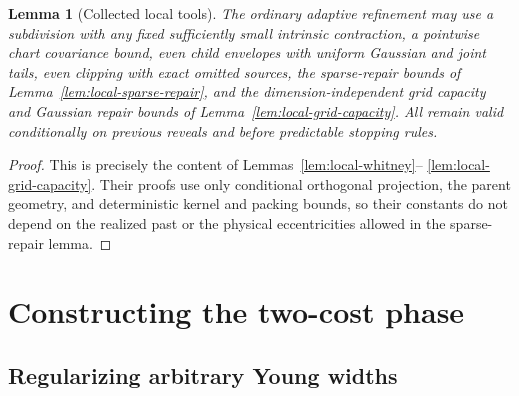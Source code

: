\documentclass[11pt]{article}
\newtheorem{lemma}[theorem]{Lemma}
\numberwithin{equation}{section}
\begin{document}
\begin{lemma}[Collected local tools]\label{lem:local-tools}
The ordinary adaptive refinement may use a subdivision with any fixed
sufficiently small intrinsic contraction, a pointwise chart covariance
bound, even child envelopes with uniform Gaussian and joint tails, even
clipping with exact omitted sources, the sparse-repair bounds of
Lemma~\ref{lem:local-sparse-repair}, and the dimension-independent grid
capacity and Gaussian repair bounds of
Lemma~\ref{lem:local-grid-capacity}. All remain valid conditionally on
previous reveals and before predictable stopping rules.
\end{lemma}
\begin{proof}
This is precisely the content of Lemmas~\ref{lem:local-whitney}--
\ref{lem:local-grid-capacity}. Their proofs use only conditional
orthogonal projection, the parent geometry, and deterministic kernel
and packing bounds, so their constants do not depend on the realized
past or the physical eccentricities allowed in the sparse-repair lemma.
\end{proof}



\section{Constructing the two-cost phase}

\subsection{Regularizing arbitrary Young widths}
\label{pair:sec:width-regularization}
\end{document}
